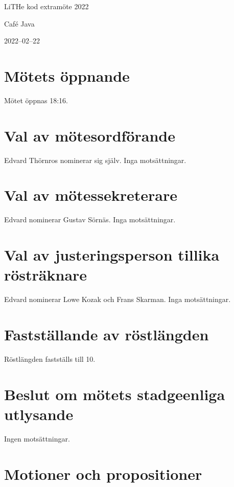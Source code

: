 \documentclass[a4paper]{article}
\begin{document}
\begin{center}
{\huge LiTHe kod extramöte 2022}\par
\vspace{0.5em}
{\Large Caf\'e Java}\par
{\Large 2022\hspace{0.1em}--\hspace{0.1em}02\hspace{0.1em}--\hspace{0.1em}22}
\vspace{1.5em}
\end{center}

\section{Mötets öppnande}

Mötet öppnas 18:16.

\section{Val av mötesordförande}

Edvard Thörnros nominerar sig själv. Inga motsättningar.

\section{Val av mötessekreterare}

Edvard nominerar Gustav Sörnäs. Inga motsättningar.

\section{Val av justeringsperson tillika rösträknare}

Edvard nominerar Lowe Kozak och Frans Skarman. Inga motsättningar.

\section{Fastställande av röstlängden}

Röstlängden fastställs till 10.

\section{Beslut om mötets stadgeenliga utlysande}

Ingen motsättningar.

\section{Motioner och propositioner}
\end{document}
